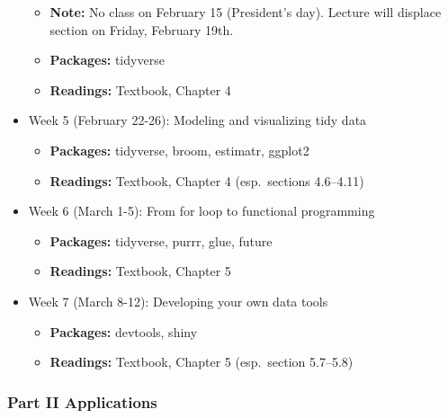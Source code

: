\documentclass[
]{article}
\providecommand{\tightlist}{%
  \setlength{\itemsep}{0pt}\setlength{\parskip}{0pt}}
\begin{document}
\begin{itemize}
  \begin{itemize}
  \tightlist
  \item
    \textbf{Note:} No class on February 15 (President's day). Lecture
    will displace section on Friday, February 19th.
  \item
    \textbf{Packages:} tidyverse
  \item
    \textbf{Readings:} Textbook, Chapter 4
  \end{itemize}
\item
  Week 5 (February 22-26): Modeling and visualizing tidy data

  \begin{itemize}
  \tightlist
  \item
    \textbf{Packages:} tidyverse, broom, estimatr, ggplot2
  \item
    \textbf{Readings:} Textbook, Chapter 4 (esp.~sections 4.6--4.11)
  \end{itemize}
\item
  Week 6 (March 1-5): From for loop to functional programming

  \begin{itemize}
  \tightlist
  \item
    \textbf{Packages:} tidyverse, purrr, glue, future
  \item
    \textbf{Readings:} Textbook, Chapter 5
  \end{itemize}
\item
  Week 7 (March 8-12): Developing your own data tools

  \begin{itemize}
  \tightlist
  \item
    \textbf{Packages:} devtools, shiny
  \item
    \textbf{Readings:} Textbook, Chapter 5 (esp.~section 5.7--5.8)
  \end{itemize}
\end{itemize}

\hypertarget{part-ii-applications-1}{%
\subsubsection{Part II Applications}\label{part-ii-applications-1}}
\end{document}
